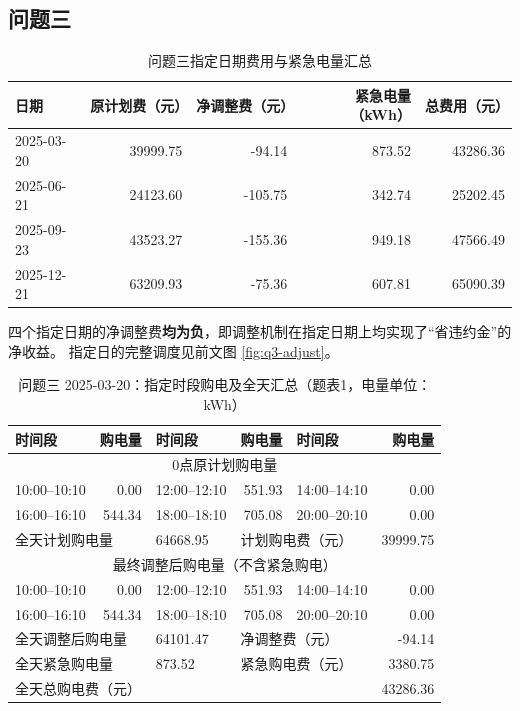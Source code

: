 \FloatBarrier
\clearpage
\subsection{问题三}
\begin{table}[H]
\centering\footnotesize
\setlength{\tabcolsep}{4pt}
\caption{问题三指定日期费用与紧急电量汇总}
\label{tab:q3-target}
\begin{tabular}{@{}lrrrr@{}}
\toprule
日期 & 原计划费（元） & 净调整费（元） & 紧急电量（kWh） & 总费用（元） \\
\midrule
2025-03-20 & 39999.75 & -94.14 & 873.52 & 43286.36 \\
2025-06-21 & 24123.60 & -105.75 & 342.74 & 25202.45 \\
2025-09-23 & 43523.27 & -155.36 & 949.18 & 47566.49 \\
2025-12-21 & 63209.93 & -75.36 & 607.81 & 65090.39 \\
\bottomrule
\end{tabular}
\end{table}

四个指定日期的净调整费\textbf{均为负}，即调整机制在指定日期上均实现了“省违约金”的净收益。
指定日的完整调度见前文图 \ref{fig:q3-adjust}。

\begin{table}[H]
\centering\footnotesize
\setlength{\tabcolsep}{4pt}
\caption{问题三 2025-03-20：指定时段购电及全天汇总（题表1，电量单位：kWh）}
\label{tab:required-q3-2025-03-20-grid}
\begin{tabular}{@{}lrlrlr@{}}
\toprule
时间段 & 购电量 & 时间段 & 购电量 & 时间段 & 购电量 \\
\midrule
\multicolumn{6}{c}{0点原计划购电量} \\
10:00--10:10 & 0.00 & 12:00--12:10 & 551.93 & 14:00--14:10 & 0.00 \\
16:00--16:10 & 544.34 & 18:00--18:10 & 705.08 & 20:00--20:10 & 0.00 \\
\multicolumn{2}{l}{全天计划购电量} & 64668.95 & \multicolumn{2}{l}{计划购电费（元）} & 39999.75 \\
\multicolumn{6}{c}{最终调整后购电量（不含紧急购电）} \\
10:00--10:10 & 0.00 & 12:00--12:10 & 551.93 & 14:00--14:10 & 0.00 \\
16:00--16:10 & 544.34 & 18:00--18:10 & 705.08 & 20:00--20:10 & 0.00 \\
\multicolumn{2}{l}{全天调整后购电量} & 64101.47 & \multicolumn{2}{l}{净调整费（元）} & -94.14 \\
\multicolumn{2}{l}{全天紧急购电量} & 873.52 & \multicolumn{2}{l}{紧急购电费（元）} & 3380.75 \\
\multicolumn{5}{l}{全天总购电费（元）} & 43286.36 \\
\bottomrule
\end{tabular}
\end{table}

